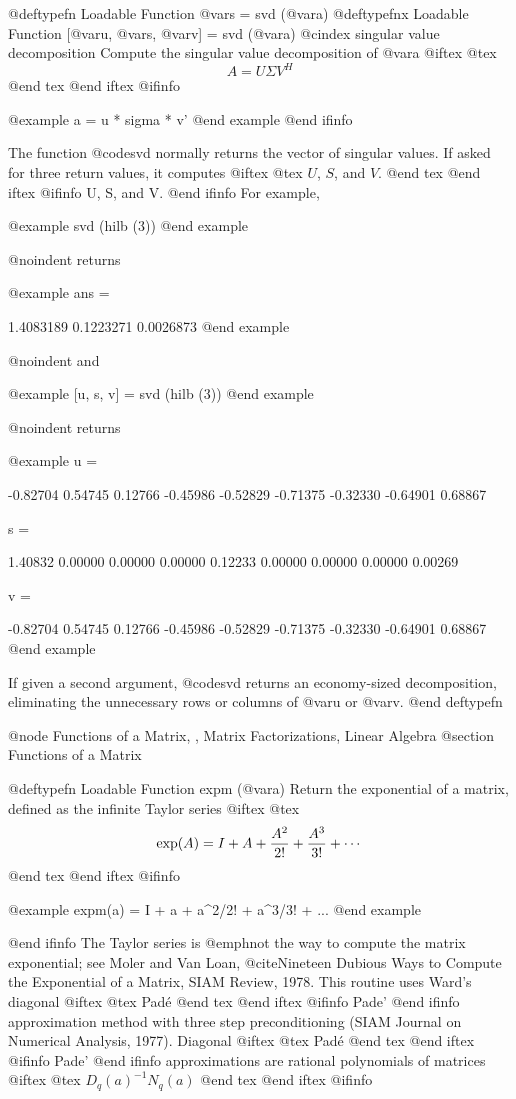 @deftypefn {Loadable Function} {@var{s} =} svd (@var{a})
@deftypefnx {Loadable Function} {[@var{u}, @var{s}, @var{v}] =} svd (@var{a})
@cindex singular value decomposition
Compute the singular value decomposition of @var{a}
@iftex
@tex
$$
 A = U\Sigma V^H
$$
@end tex
@end iftex
@ifinfo

@example
a = u * sigma * v'
@end example
@end ifinfo

The function @code{svd} normally returns the vector of singular values.
If asked for three return values, it computes
@iftex
@tex
$U$, $S$, and $V$.
@end tex
@end iftex
@ifinfo
U, S, and V.
@end ifinfo
For example,

@example
svd (hilb (3))
@end example

@noindent
returns

@example
ans =

  1.4083189
  0.1223271
  0.0026873
@end example

@noindent
and

@example
[u, s, v] = svd (hilb (3))
@end example

@noindent
returns

@example
u =

  -0.82704   0.54745   0.12766
  -0.45986  -0.52829  -0.71375
  -0.32330  -0.64901   0.68867

s =

  1.40832  0.00000  0.00000
  0.00000  0.12233  0.00000
  0.00000  0.00000  0.00269

v =

  -0.82704   0.54745   0.12766
  -0.45986  -0.52829  -0.71375
  -0.32330  -0.64901   0.68867
@end example

If given a second argument, @code{svd} returns an economy-sized
decomposition, eliminating the unnecessary rows or columns of @var{u} or
@var{v}.
@end deftypefn

@node Functions of a Matrix,  , Matrix Factorizations, Linear Algebra
@section Functions of a Matrix

@deftypefn {Loadable Function} {} expm (@var{a})
Return the exponential of a matrix, defined as the infinite Taylor
series
@iftex
@tex
$$
 \exp (A) = I + A + {A^2 \over 2!} + {A^3 \over 3!} + \cdots
$$
@end tex
@end iftex
@ifinfo

@example
expm(a) = I + a + a^2/2! + a^3/3! + ...
@end example

@end ifinfo
The Taylor series is @emph{not} the way to compute the matrix
exponential; see Moler and Van Loan, @cite{Nineteen Dubious Ways to
Compute the Exponential of a Matrix}, SIAM Review, 1978.  This routine
uses Ward's diagonal
@iftex
@tex
Pad\'e
@end tex
@end iftex
@ifinfo
Pade'
@end ifinfo
approximation method with three step preconditioning (SIAM Journal on
Numerical Analysis, 1977).  Diagonal
@iftex
@tex
Pad\'e
@end tex
@end iftex
@ifinfo
Pade'
@end ifinfo
 approximations are rational polynomials of matrices
@iftex
@tex
$D_q(a)^{-1}N_q(a)$
@end tex
@end iftex
@ifinfo

